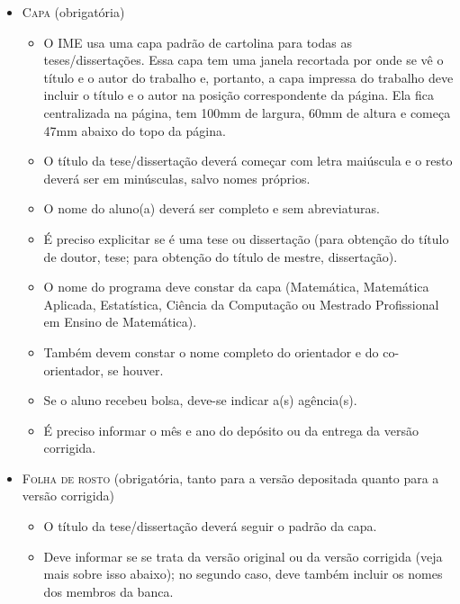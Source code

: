 \begin{itemize}
  \item \textsc{Capa} (obrigatória)
  \begin{itemize}
    \item O IME usa uma capa padrão de cartolina para todas as
    teses/dissertações. Essa capa tem uma janela recortada por onde se
    vê o título e o autor do trabalho e, portanto, a capa impressa do
    trabalho deve incluir o título e o autor na posição correspondente da
    página. Ela fica centralizada na página, tem 100mm de largura, 60mm de
    altura e começa 47mm abaixo do topo da página.

    \item O título da tese/dissertação deverá começar com letra maiúscula
    e o resto deverá ser em minúsculas, salvo nomes próprios.

    \item O nome do aluno(a) deverá ser completo e sem abreviaturas.

    \item É preciso explicitar se é uma tese ou dissertação (para
    obtenção do título de doutor, tese; para obtenção do título de
    mestre, dissertação).

    \item O nome do programa deve constar da capa (Matemática,
    Matemática Aplicada, Estatística, Ciência da Computação ou
    Mestrado Profissional em Ensino de Matemática).

    \item Também devem constar o nome completo do orientador e do
    co-orientador, se houver.

    \item Se o aluno recebeu bolsa, deve-se indicar a(s) agência(s).

    \item É preciso informar o mês e ano do depósito ou da entrega da
    versão corrigida.
  \end{itemize}

  \newpage %

  \item \textsc{Folha de rosto} (obrigatória, tanto para a versão
  depositada quanto para a versão corrigida)
  \begin{itemize}
    \item O título da tese/dissertação deverá seguir o padrão da capa.

    \item Deve informar se se trata da versão original ou da versão
    corrigida (veja mais sobre isso abaixo); no segundo caso, deve
    também incluir os nomes dos membros da banca.
  \end{itemize}


\end{itemize}

